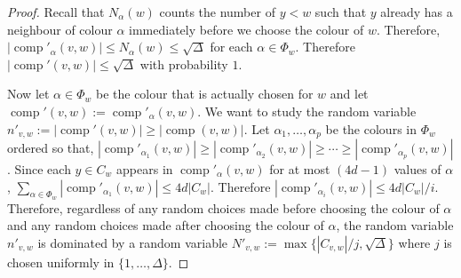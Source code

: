 \documentclass[kpfonts]{patmorin}
\DeclareMathOperator{\comp}{comp}
\begin{document}
\begin{proof}
  Recall that $N_\alpha(w)$ counts the number of $y < w$ such that $y$ already has a neighbour of colour $\alpha$ immediately before we choose the colour of $w$.  Therefore,  $|\comp'_\alpha(v,w)|\le N_\alpha(w)\le \sqrt{\Delta}$ for each $\alpha\in\Phi_w$.  Therefore $|\comp'(v,w)|\le\sqrt{\Delta}$ with probability $1$.

  Now let $\alpha\in\Phi_w$ be the colour that is actually chosen for $w$ and let $\comp'(v,w):=\comp'_\alpha(v,w)$.  We want to study the random variable $n'_{v,w}:=|\comp'(v,w)|\ge |\comp(v,w)|$.  Let $\alpha_1,\ldots,\alpha_p$ be the colours in $\Phi_w$ ordered so that, $|\comp'_{\alpha_1}(v,w)|\ge|\comp'_{\alpha_2}(v,w)|\ge\cdots\ge |\comp'_{\alpha_p}(v,w)|$.  Since each $y\in C_w$ appears in
  $\comp'_{\alpha}(v,w)$ for at most $(4d-1)$ values of $\alpha$,  $\sum_{\alpha\in\Phi_w} |\comp'_{\alpha_1}(v,w)| \le 4d|C_w|$.
  Therefore $|\comp'_{\alpha_i}(v,w)|\le 4d|C_w|/i$.    Therefore, regardless of any random choices made before choosing the colour of $\alpha$ and any random choices made after choosing the colour of $\alpha$, the random variable $n'_{v,w}$ is dominated by a random variable $N'_{v,w}:=\max\{|C_{v,w}|/j,\sqrt{\Delta}\}$ where $j$ is chosen uniformly in $\{1,\ldots,\Delta\}$.


\end{proof}
\end{document}
